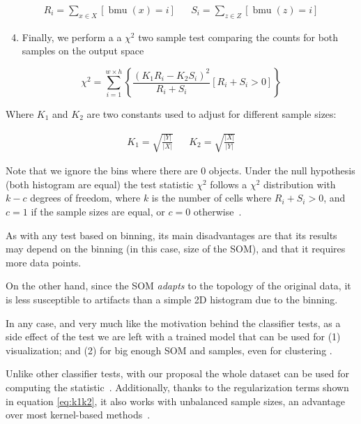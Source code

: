 \begin{align}
    R_i = \sum_{x \in X} [ \operatorname{bmu}(x) = i ] && S_i = \sum_{z \in Z} [ \operatorname{bmu}(z) = i ]
\end{align}

\begin{enumerate}
    \setcounter{enumi}{3}
    \item Finally, we perform a a $\chi^2$ two sample test comparing the counts for both samples
    on the output space
\end{enumerate}

\begin{equation}
    \label{eq:chi2}
    \chi^2 = \sum_{i=1}^{w \times h}{ \left\{ \frac{(K_1 R_i - K_2 S_i)^2}{R_i + S_i} [ R_i + S_i > 0 ] \right\}}
\end{equation}

Where $K_1$ and $K_2$ are two constants used to adjust for different sample sizes:

\begin{align}
    \label{eq:k1k2} K_1 = \sqrt{\frac{|Y|}{|X|}} && K_2 = \sqrt{\frac{|X|}{|Y|}}
\end{align}

Note that we ignore the bins where there are 0 objects. Under the null hypothesis
(both histogram are equal) the test statistic $\chi^2$ follows a $\chi^2$ distribution
with $k - c$ degrees of freedom,
where $k$ is the number of cells where ${R_i + S_i > 0}$, and $c = 1$ if the sample sizes are equal,
or $c = 0$ otherwise~\cite{press1993numerical}.

As with any test based on binning, its main disadvantages are that its results may
depend on the binning (in this case, size of the SOM), and that it requires more data points.

On the other hand, since the SOM \textit{adapts} to the topology of the original data,
it is less susceptible to artifacts than a simple 2D histogram due to the binning.

In any case, and very much like the motivation behind the classifier tests, as a side effect
of the test we are left with a trained model that can be used for (1) visualization; and (2) for
big enough SOM and samples, even for clustering \cite{ultsch2005esom}.

Unlike other classifier tests, with our proposal the whole dataset can be used for computing the
statistic~\cite{kirchler2020two}. Additionally, thanks to the regularization terms shown
in equation \ref{eq:k1k2}, it also works with unbalanced sample sizes, an
advantage over most kernel-based methods~\cite{song2021fast}.


